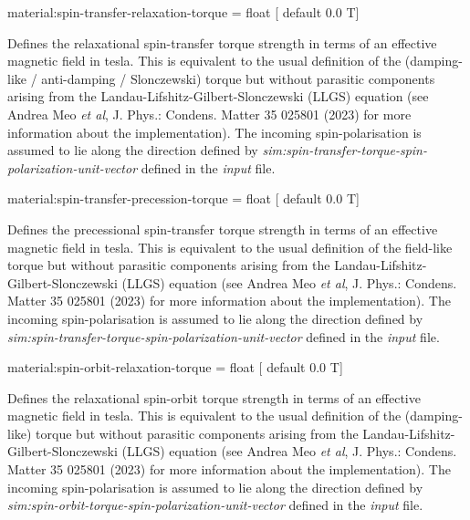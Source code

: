 {\zicf material:spin-transfer-relaxation-torque = float [ default 0.0 T]}
Defines the relaxational spin-transfer torque strength in terms of an effective
magnetic field in tesla. This is equivalent to the usual definition of the
(damping-like / anti-damping / Slonczewski) torque but without parasitic
components arising from the Landau-Lifshitz-Gilbert-Slonczewski (LLGS) equation
(see Andrea Meo \textit{et al}, J. Phys.: Condens. Matter 35 025801 (2023) for
more information about the implementation). The incoming spin-polarisation is
assumed to lie along the direction defined by
\textit{sim:spin-transfer-torque-spin-polarization-unit-vector} defined in the
\textit{input} file.

{\zicf material:spin-transfer-precession-torque = float [ default 0.0 T]}
Defines the precessional spin-transfer torque strength in terms of an effective
magnetic field in tesla. This is equivalent to the usual definition of the
field-like torque but without parasitic components arising from the
Landau-Lifshitz-Gilbert-Slonczewski (LLGS) equation (see Andrea Meo
\textit{et al}, J. Phys.: Condens. Matter 35 025801 (2023) for more information
about the implementation). The incoming spin-polarisation is assumed to lie
along the direction defined by \textit{sim:spin-transfer-torque-spin-polarization-unit-vector}
defined in the \textit{input} file.

{\zicf material:spin-orbit-relaxation-torque = float [ default 0.0 T]}
Defines the relaxational spin-orbit torque strength in terms of an effective
magnetic field in tesla. This is equivalent to the usual definition of the
(damping-like) torque but without parasitic components arising from the
Landau-Lifshitz-Gilbert-Slonczewski (LLGS) equation (see Andrea Meo
\textit{et al}, J. Phys.: Condens. Matter 35 025801 (2023) for more information
about the implementation). The incoming spin-polarisation is assumed to lie
along the direction defined by \textit{sim:spin-orbit-torque-spin-polarization-unit-vector}
defined in the \textit{input} file.

